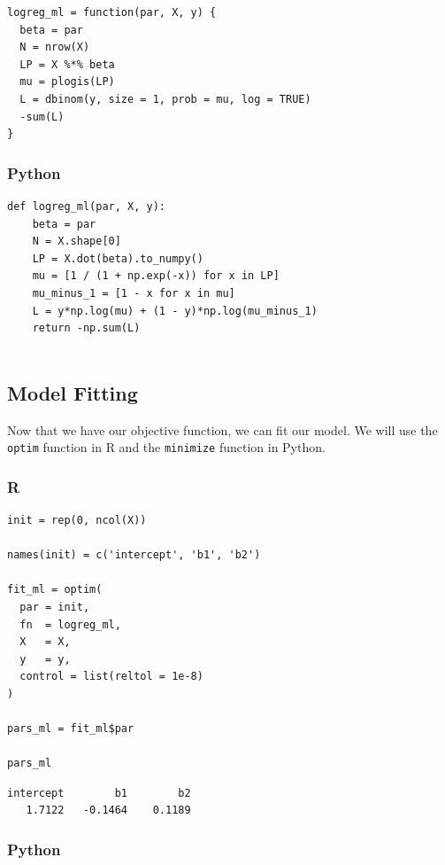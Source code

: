 \documentclass[
  letterpaper,
]{krantz}
\begin{document}
\begin{verbatim}
logreg_ml = function(par, X, y) {
  beta = par
  N = nrow(X)
  LP = X %*% beta                           
  mu = plogis(LP)                           
  L = dbinom(y, size = 1, prob = mu, log = TRUE)   
  -sum(L)                                   
}
\end{verbatim}

\subsubsection{Python}

\begin{verbatim}
def logreg_ml(par, X, y):
    beta = par
    N = X.shape[0]
    LP = X.dot(beta).to_numpy()  
    mu = [1 / (1 + np.exp(-x)) for x in LP]
    mu_minus_1 = [1 - x for x in mu]
    L = y*np.log(mu) + (1 - y)*np.log(mu_minus_1)   
    return -np.sum(L)   
  
\end{verbatim}

\subsection{Model Fitting}\label{sec-glm-binomial-fitting}

Now that we have our objective function, we can fit our model. We will
use the \texttt{optim} function in R and the \texttt{minimize} function
in Python.

\subsubsection{R}

\begin{verbatim}
init = rep(0, ncol(X))

names(init) = c('intercept', 'b1', 'b2')

fit_ml = optim(
  par = init,
  fn  = logreg_ml,
  X   = X,
  y   = y,
  control = list(reltol = 1e-8)
)

pars_ml = fit_ml$par

pars_ml
\end{verbatim}

\begin{verbatim}
intercept        b1        b2 
   1.7122   -0.1464    0.1189 
\end{verbatim}

\subsubsection{Python}
\end{document}
